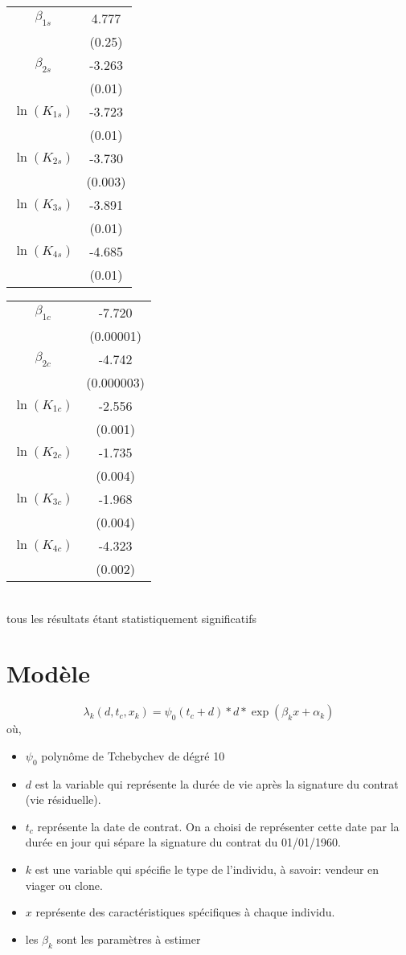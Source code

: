 \documentclass{article}
\begin{document}
\begin{tabular}{c|c||}


            
$\beta_{1s}$ & 4.777   \\
            &(0.25)    \\
$\beta_{2s} $&-3.263  \\
            &(0.01)  \\
$\ln(K_{1s}) $& -3.723  \\
        &(0.01)    \\
$\ln(K_{2s})$ & -3.730 \\
        &(0.003)    \\
$\ln(K_{3s})$ & -3.891  \\
        &(0.01)    \\
$\ln(K_{4s})$ & -4.685  \\
        &(0.01)    \\
        \end{tabular}
        \begin{tabular}{c|c|}
$\beta_{1c}$ & -7.720 \\
            &(0.00001)  \\
$\beta_{2c}$ & -4.742  \\
            &(0.000003) \\
$\ln(K_{1c})$ & -2.556 \\
        &(0.001)  \\
$\ln(K_{2c})$ & -1.735  \\
        &(0.004) \\
$\ln(K_{3c})$ & -1.968  \\
        &(0.004) \\
$\ln(K_{4c})$ & -4.323   \\
        &(0.002)  \\
\end{tabular}\\

tous les résultats étant statistiquement significatifs


\section{Modèle}
\begin{displaymath}
\lambda_{k}(d,t_c,x_k)=\psi_{0}(t_c+d)*d*\exp(\beta_k x+\alpha_k)
\end{displaymath}
où,
\begin{itemize}
\item $\psi_{0}$ polynôme de Tchebychev de dégré 10
\item $d$ est la variable qui représente la durée de vie après la signature du contrat (vie résiduelle).
\item $t_c$ représente la date de contrat. On a choisi de représenter cette date par la durée en jour qui sépare la signature du contrat du 01/01/1960.
\item $k$  est une variable qui spécifie le type de l’individu, à savoir: vendeur en viager ou clone.
\item $x$ représente des caractéristiques spécifiques à chaque individu.
\item les $\beta_k$ sont les paramètres à estimer
\end{itemize}
\end{document}
